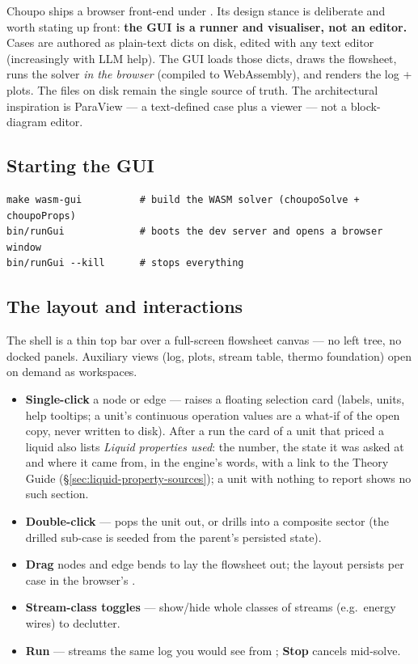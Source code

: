 \documentclass[11pt,a4paper]{article}
\begin{document}
Choupo ships a browser front-end under .  Its design stance
is deliberate and worth stating up front: \textbf{the GUI is a runner
and visualiser, not an editor.}  Cases are authored as plain-text dicts
on disk, edited with any text editor (increasingly with LLM help).  The
GUI loads those dicts, draws the flowsheet, runs the solver \emph{in
the browser} (compiled to WebAssembly), and renders the log + plots.
The files on disk remain the single source of truth.  The architectural
inspiration is ParaView --- a text-defined case plus a viewer --- not a
block-diagram editor.

\subsection{Starting the GUI}

\begin{lstlisting}
make wasm-gui          # build the WASM solver (choupoSolve + choupoProps)
bin/runGui             # boots the dev server and opens a browser window
bin/runGui --kill      # stops everything
\end{lstlisting}

\subsection{The layout and interactions}

The shell is a thin top bar over a full-screen flowsheet canvas --- no
left tree, no docked panels.  Auxiliary views (log, plots, stream
table, thermo foundation) open on demand as workspaces.

\begin{itemize}[leftmargin=*,nosep,topsep=2pt]
  \item \textbf{Single-click} a node or edge --- raises a floating
        selection card (labels, units, help tooltips; a unit's continuous
        operation values are a what-if of the open copy, never written
        to disk).  After a run the card of a unit that priced a liquid
        also lists \emph{Liquid properties used}: the number, the state it
        was asked at and where it came from, in the engine's words, with
        a link to the Theory Guide (\S\ref{sec:liquid-property-sources});
        a unit with nothing to report shows no such section.
  \item \textbf{Double-click} --- pops the unit out, or drills into a
        composite sector (the drilled sub-case is seeded from the
        parent's persisted  state).
  \item \textbf{Drag} nodes and edge bends to lay the flowsheet out;
        the layout persists per case in the browser's
        .
  \item \textbf{Stream-class toggles} --- show/hide whole classes of
        streams (e.g.\ energy wires) to declutter.
  \item \textbf{Run} --- streams the same log you would see from
        ; \textbf{Stop} cancels mid-solve.
\end{itemize}
\end{document}
